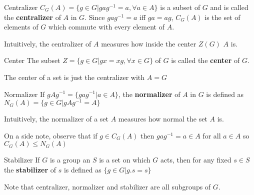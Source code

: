 \documentclass[titlepage, 12pt]{article}
\begin{document}
\begin{definition}{Centralizer}{}
    $C_G(A) = \{g\in G| gag^{-1} = a,\forall a\in A\}$ is a subset of $G$ and
    is called the \textbf{centralizer} of $A$ in $G$. Since $gag^{-1} = a$ iff
    $ga = ag$, $C_G(A)$ is the set of elements of $G$ which commute with every
    element of $A$.
\end{definition}
Intuitively, the centralizer of $A$ measures how inside the center $Z(G)$ $A$
is.

\begin{definition}{Center}{}
    The subset $Z = \{g\in G| gx = xg,\forall x\in G\}$ of $G$ is called the
    \textbf{center} of $G$.
\end{definition}
The center of a set is just the centralizer with $A = G$

\begin{definition}{Normalizer}{}
    If $gAg^{-1} = \{gag^{-1}| a\in A\}$, the \textbf{normalizer}  of $A$ in
    $G$ is defined as $N_G(A) = \{g\in G| gAg^{-1} = A \}$
\end{definition}
Intuitively, the normalizer of a set $A$ measures how normal the set $A$ is.


On a side note, observe that if $g\in C_G(A)$ then $gag^{-1} = a\in A$ for all
$a\in A$ so $C_G(A)\le N_G(A)$

\begin{definition}{Stabilizer}{}
    If $G$ is a group an $S$ is a set on which $G$ acts, then for any fixed
    $s\in S$ the \textbf{stabilizer} of $s$ is defined as $\{g\in G| g.s=s\}$
\end{definition}
Note that centralizer, normalizer and stabilizer are all subgroups of $G$.
\end{document}
